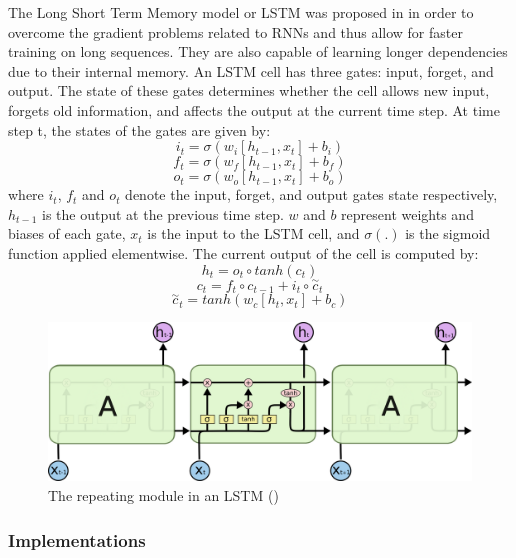 The Long Short Term Memory model or LSTM was proposed in \cite{LSTMs} in order to overcome the gradient problems related to RNNs and thus allow for faster training on long sequences.
They are also capable of learning longer dependencies due to their internal memory. An LSTM cell has three gates: input, forget, and output.
The state of these gates determines whether the cell allows new input, forgets old information, and affects the output at the current time step.
At time step t, the states of the gates are given by:
\begin{equation}
    i_t=\sigma(w_i[h_{t-1},x_t]+b_i)
\end{equation}
\begin{equation}
    f_t=\sigma(w_f[h_{t-1},x_t]+b_f)
\end{equation}
\begin{equation}
    o_t=\sigma(w_o[h_{t-1},x_t]+b_o)
\end{equation}
where $i_t$, $f_t$ and $o_t$ denote the input, forget, and output gates state respectively, $h_{t-1}$ is the output at the previous time step.
$w$ and $b$ represent weights and biases of each gate, $x_t$ is the input to the LSTM cell, and $\sigma (.)$ is the sigmoid function applied elementwise.
The current output of the cell is computed by:
\begin{equation}
    h_t=o_t \circ tanh(c_t)
\end{equation}
\begin{equation}
    c_t = f_t \circ c_{t-1}+i_t \circ \overset{\sim}{c}_t
\end{equation}
\begin{equation}
    \overset{\sim}{c}_t = tanh(w_c[h_t,x_t]+b_c)
\end{equation}

\begin{figure}
    \centering
    \includegraphics[width=0.8\columnwidth]{Figures/LSTM}
    \decoRule
    \caption{The repeating module in an LSTM (\cite{oinkina})}
    \label{fig:LSTM}
\end{figure}

\subsubsection{Implementations}

